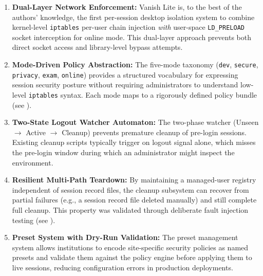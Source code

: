 \begin{enumerate}[label=\textbf{C\arabic*.}]
    \item \textbf{Dual-Layer Network Enforcement:} Vanish Lite is, to the best of the authors' knowledge, the first per-session desktop isolation system to combine kernel-level \texttt{iptables} per-user chain injection \emph{with} user-space \texttt{LD\_PRELOAD} socket interception for online mode. This dual-layer approach prevents both direct socket access and library-level bypass attempts.

    \item \textbf{Mode-Driven Policy Abstraction:} The five-mode taxonomy (\texttt{dev}, \texttt{secure}, \texttt{privacy}, \texttt{exam}, \texttt{online}) provides a structured vocabulary for expressing session security posture without requiring administrators to understand low-level \texttt{iptables} syntax. Each mode maps to a rigorously defined policy bundle (see ).

    \item \textbf{Two-State Logout Watcher Automaton:} The two-phase watcher (Unseen $\to$ Active $\to$ Cleanup) prevents premature cleanup of pre-login sessions. Existing cleanup scripts typically trigger on logout signal alone, which misses the pre-login window during which an administrator might inspect the environment.

    \item \textbf{Resilient Multi-Path Teardown:} By maintaining a managed-user registry independent of session record files, the cleanup subsystem can recover from partial failures (e.g., a session record file deleted manually) and still complete full cleanup. This property was validated through deliberate fault injection testing (see ).

    \item \textbf{Preset System with Dry-Run Validation:} The preset management system allows institutions to encode site-specific security policies as named presets and validate them against the policy engine before applying them to live sessions, reducing configuration errors in production deployments.
\end{enumerate}
